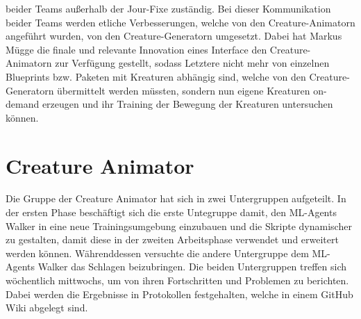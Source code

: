 beider Teams außerhalb der Jour-Fixe zuständig. Bei dieser Kommunikation beider Teams werden etliche Verbesserungen, welche von den Creature-Animatorn angeführt wurden, von den Creature-Generatorn umgesetzt. Dabei hat Markus Mügge die finale und relevante Innovation eines Interface den Creature-Animatorn zur Verfügung gestellt, sodass Letztere nicht mehr von einzelnen Blueprints bzw. Paketen mit Kreaturen abhängig sind, welche von den Creature-Generatorn übermittelt werden müssten, sondern nun eigene Kreaturen on-demand erzeugen und ihr Training der Bewegung der Kreaturen untersuchen können.



\section{Creature Animator}\label{sec:creature-animation-orga}
Die Gruppe der Creature Animator hat sich in zwei Untergruppen aufgeteilt. In der ersten Phase beschäftigt sich die erste Untegruppe damit, den ML-Agents Walker in eine neue Trainingsumgebung einzubauen und die Skripte dynamischer zu gestalten, damit diese in der zweiten Arbeitsphase verwendet und erweitert werden können. Währenddessen versuchte die andere Untergruppe dem ML-Agents Walker das Schlagen beizubringen. Die beiden Untergruppen treffen sich wöchentlich mittwochs, um von ihren Fortschritten und Problemen zu berichten. Dabei werden die Ergebnisse in Protokollen festgehalten, welche in einem GitHub Wiki abgelegt sind.

